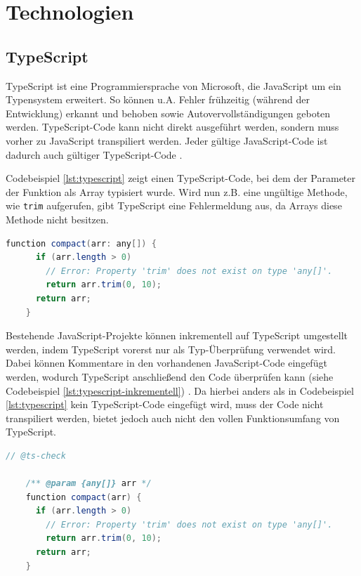\chapter{Technologien}

%
%
\section{TypeScript}

TypeScript ist eine Programmiersprache von Microsoft, die JavaScript um ein Typensystem erweitert. So können u.A. Fehler frühzeitig (während der Entwicklung) erkannt und behoben sowie Autovervollständigungen geboten werden. TypeScript-Code kann nicht direkt ausgeführt werden, sondern muss vorher zu JavaScript transpiliert werden. Jeder gültige JavaScript-Code ist dadurch auch gültiger TypeScript-Code \cites[vgl.][]{TypeScript}[vgl.][]{TypeScriptForJSDevelopers}.

Codebeispiel \ref{lst:typescript} zeigt einen TypeScript-Code, bei dem der Parameter der Funktion als Array typisiert wurde. Wird nun z.B. eine ungültige Methode, wie \lstinline{trim} aufgerufen, gibt TypeScript eine Fehlermeldung aus, da Arrays diese Methode nicht besitzen.

\vspace{2\parskip}
\begin{minipage}{\linewidth}
  \begin{lstlisting}[language=java, frame=single, label=lst:typescript, caption=Beispiel für TypeScript-Code]
    function compact(arr: any[]) {
      if (arr.length > 0)
        // Error: Property 'trim' does not exist on type 'any[]'.
        return arr.trim(0, 10);
      return arr;
    }
  \end{lstlisting}
\end{minipage}

Bestehende JavaScript-Projekte können inkrementell auf TypeScript umgestellt werden, indem TypeScript vorerst nur als Typ-Überprüfung verwendet wird. Dabei können Kommentare in den vorhandenen JavaScript-Code eingefügt werden, wodurch TypeScript anschließend den Code überprüfen kann (siehe Codebeispiel \ref{lst:typescript-inkrementell}) \cite[vgl.][]{TypeScript}. Da hierbei anders als in Codebeispiel \ref{lst:typescript} kein TypeScript-Code eingefügt wird, muss der Code nicht transpiliert werden, bietet jedoch auch nicht den vollen Funktionsumfang von TypeScript.

\begin{minipage}{\linewidth}
  \begin{lstlisting}[language=java, frame=single, label=lst:typescript-inkrementell, caption=Erweiterung von JavaScript-Code um TypeScript Typ-Überprüfung]
    // @ts-check

    /** @param {any[]} arr */
    function compact(arr) {
      if (arr.length > 0)
        // Error: Property 'trim' does not exist on type 'any[]'.
        return arr.trim(0, 10);
      return arr;
    }
  \end{lstlisting}
\end{minipage}

